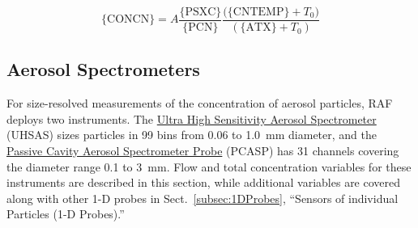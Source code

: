 \begin{hangparagraphs}
\begin{minipage}[t]{1\columnwidth}
{\begin{minipage}[t]{0.9\textwidth}
\begin{equation}
\mathrm{\{CONCN\}}=A\frac{\mathrm{\{PSXC\}}}{\mathrm{\{PCN\}}}\frac{\mathrm{(\{CNTEMP\}}+T_{0})}{(\mathrm{\{ATX\}}+T_{0})}\label{eq:12.2}
\end{equation}
%
\end{minipage}} %
\end{minipage}

\vfill\eject
\end{hangparagraphs}


\subsection{Aerosol Spectrometers}

For size-resolved measurements of the
concentration of aerosol particles, RAF deploys two instruments. The
\href{https://www.eol.ucar.edu/instruments/ultra-high-sensitivity-aerosol-spectrometer}{Ultra High Sensitivity Aerosol Spectrometer}
(UHSAS) sizes particles in 99 bins from 0.06 to 1.0~\textgreek{m}m
diameter, and the \href{http://www.eol.ucar.edu/instruments/passive-cavity-aerosol-spectrometer-probe}{Passive Cavity Aerosol Spectrometer Probe}
(PCASP) has 31 channels covering the diameter range
0.1 to 3~\textgreek{m}m. Flow and total concentration variables for
these instruments are described in this section, while additional
variables are covered along with other 1-D probes in Sect.~\ref{subsec:1DProbes},
``Sensors of individual Particles (1-D Probes).''
